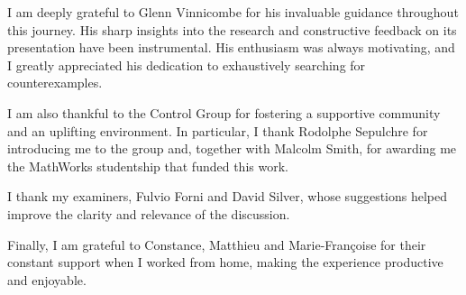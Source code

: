 
\begin{acknowledgements}      

I am deeply grateful to Glenn Vinnicombe for his invaluable guidance throughout this journey.
His sharp insights into the research and constructive feedback on its presentation have been instrumental.
His enthusiasm was always motivating, 
and I greatly appreciated his dedication to exhaustively searching for counterexamples.

I am also thankful to the Control Group for fostering a supportive community and an uplifting environment.
In particular,
I thank Rodolphe Sepulchre for introducing me to the group and, together with Malcolm Smith, for awarding me the MathWorks studentship that funded this work.

I thank my examiners, Fulvio Forni and David Silver, whose suggestions helped improve the clarity and relevance of the discussion.


Finally, I am grateful to Constance, Matthieu and Marie-Françoise 
for their constant support
when I worked from home, making the experience productive and enjoyable.



\end{acknowledgements}

